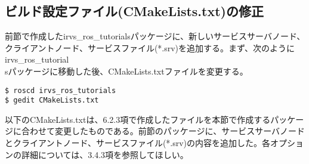 \subsection{ビルド設定ファイル(CMakeLists.txt)の修正}

前節で作成したirvs\_ros\_tutorialsパッケージに、新しいサービスサーバノード、クライアントノード、サービスファイル(*.srv)を追加する。まず、次のようにirvs\_ros\_tutorial\\sパッケージに移動した後、CMakeLists.txtファイルを変更する。

\begin{lstlisting}[language=ROS]
$ roscd irvs_ros_tutorials
$ gedit CMakeLists.txt
\end{lstlisting}

以下のCMakeLists.txtは、6.2.3項で作成したファイルを本節で作成するパッケージに合わせて変更したものである。前節のパッケージに、サービスサーバノードとクライアントノード、サービスファイル(*.srv)の内容を追加した。各オプションの詳細については、3.4.3項を参照してほしい。

